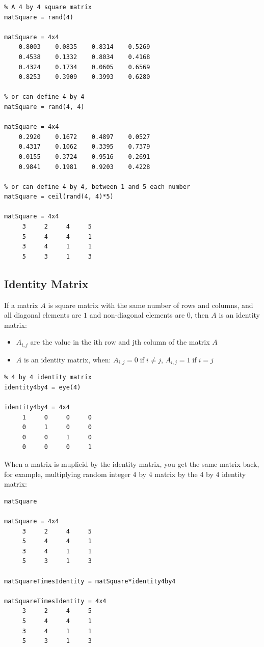 \documentclass[
]{book}
\begin{document}
\begin{verbatim}
% A 4 by 4 square matrix
matSquare = rand(4)

matSquare = 4x4    
    0.8003    0.0835    0.8314    0.5269
    0.4538    0.1332    0.8034    0.4168
    0.4324    0.1734    0.0605    0.6569
    0.8253    0.3909    0.3993    0.6280

% or can define 4 by 4
matSquare = rand(4, 4)

matSquare = 4x4    
    0.2920    0.1672    0.4897    0.0527
    0.4317    0.1062    0.3395    0.7379
    0.0155    0.3724    0.9516    0.2691
    0.9841    0.1981    0.9203    0.4228

% or can define 4 by 4, between 1 and 5 each number
matSquare = ceil(rand(4, 4)*5)

matSquare = 4x4    
     3     2     4     5
     5     4     4     1
     3     4     1     1
     5     3     1     3
\end{verbatim}

\hypertarget{identity-matrix}{%
\subsection{Identity Matrix}\label{identity-matrix}}

If a matrix \(A\) is square matrix with the same number of rows and
columns, and all diagonal elements are \(1\) and non-diagonal elements are
\(0\), then \(A\) is an identity matrix:

\begin{itemize}
\item
  \(A_{i,j}\) are the value in the ith row and jth column of the matrix
  \(A\)
\item
  \(A\) is an identity matrix, when:
  \(A_{i,j} =0\;\textrm{if}\;i\not= j\), \(A_{i,j} =1\;\textrm{if}\;i=j\)
\end{itemize}

\begin{verbatim}
% 4 by 4 identity matrix
identity4by4 = eye(4)

identity4by4 = 4x4    
     1     0     0     0
     0     1     0     0
     0     0     1     0
     0     0     0     1
\end{verbatim}

When a matrix is muplieid by the identity matrix, you get the same
matrix back, for example, multiplying random integer 4 by 4 matrix by
the 4 by 4 identity matrix:

\begin{verbatim}
matSquare

matSquare = 4x4    
     3     2     4     5
     5     4     4     1
     3     4     1     1
     5     3     1     3

matSquareTimesIdentity = matSquare*identity4by4

matSquareTimesIdentity = 4x4    
     3     2     4     5
     5     4     4     1
     3     4     1     1
     5     3     1     3
\end{verbatim}
\end{document}
